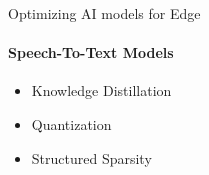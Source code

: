 \begin{frame}{Optimizing AI models for Edge}
  \framesubtitle{Speech-To-Text Models}
  \begin{itemize}
    \item Knowledge Distillation
    \item Quantization
    \item Structured Sparsity
  \end{itemize}
\end{frame}